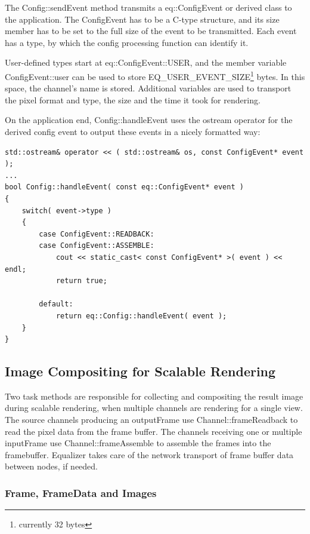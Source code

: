 \documentclass[10pt,a4]{scrartcl}
\begin{document}
The \textsf{Config::sendEvent} method transmits a
\textsf{eq::ConfigEvent} or derived class to the application. The
ConfigEvent has to be a C-type structure, and its \textsf{size}
member has to be set to the full size of the event to be transmitted.
Each event has a type, by which the config processing function can
identify it. 

User-defined types start at \textsf{eq::ConfigEvent::USER}, and the
member variable \textsf{ConfigEvent::user} can be used to store
\textsf{EQ\_USER\_EVENT\_SIZE}\footnote{currently 32 bytes} bytes. In
this space, the channel's name is stored. Additional variables are used
to transport the pixel format and type, the size and the time it took
for rendering.

On the application end, \textsf{Config::handleEvent} uses the ostream
operator for the derived config event to output these events in a nicely
formatted way:

{\footnotesize\begin{lstlisting}
std::ostream& operator << ( std::ostream& os, const ConfigEvent* event );
...
bool Config::handleEvent( const eq::ConfigEvent* event )
{
    switch( event->type )
    {
        case ConfigEvent::READBACK:
        case ConfigEvent::ASSEMBLE:
            cout << static_cast< const ConfigEvent* >( event ) << endl;
            return true;

        default:
            return eq::Config::handleEvent( event );
    }
}
\end{lstlisting}}%


\subsection{Image Compositing for Scalable Rendering}

Two task methods are responsible for collecting and compositing the
result image during scalable rendering, when multiple channels are
rendering for a single view. The source channels producing an
\textsf{outputFrame} use \textsf{Channel::frameReadback} to read the
pixel data from the frame buffer. The channels receiving one or multiple
\textsf{inputFrame} use \textsf{Channel::frameAssemb\-le} to assemble
the frames into the framebuffer. Equalizer takes care of the network
transport of frame buffer data between nodes, if needed.

\subsubsection{Frame, FrameData and Images}
\end{document}
